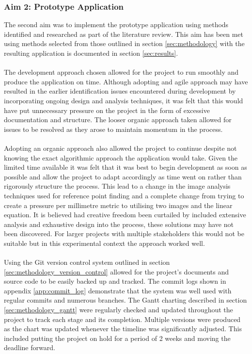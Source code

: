 		\subsubsection{Aim 2: Prototype Application}
			The second aim was to implement the prototype application using methods identified and researched as part of the literature review. This aim has been met using methods selected from those outlined in section \ref{sec:methodology} with the resulting application is documented in section \ref{sec:results}.
			\\\\
			The development approach chosen allowed for the project to run smoothly and produce the application on time. Although adopting and agile approach may have resulted in the earlier identification issues encountered during development by incorporating ongoing design and analysis techniques, it was felt that this would have put unnecessary pressure on the project in the form of excessive documentation and structure. The looser organic approach taken allowed for issues to be resolved as they arose to maintain momentum in the process. 
			\\\\
			Adopting an organic approach also allowed the project to continue despite not knowing the exact algorithmic approach the application would take. Given the limited time available it was felt that it was best to begin development as soon as possible and allow the project to adapt accordingly as time went on rather than rigorously structure the process. This lead to a change in the image analysis techniques used for reference point finding and a complete change from trying to create a pressure per millimetre metric to utilising two images and the linear equation. It is believed had creative freedom been curtailed by included extensive analysis and exhaustive design into the process, these solutions may have not been discovered. For larger projects with multiple stakeholders this would not be suitable but in this experimental context the approach worked well.
			\\\\
			Using the Git version control system outlined in section \ref{sec:methodology_version_control} allowed for the project's documents and source code to be easily backed up and tracked. The commit logs shown in appendix \ref{app:commit_log} demonstrate that the system was well used with regular commits and numerous branches. The Gantt charting described in section \ref{sec:methodology_gantt} were regularly checked and updated throughout the project to track each stage and its completion. Multiple versions were produced as the chart was updated whenever the timeline was significantly adjusted. This included putting the project on hold for a period of 2 weeks and moving the deadline forward.
